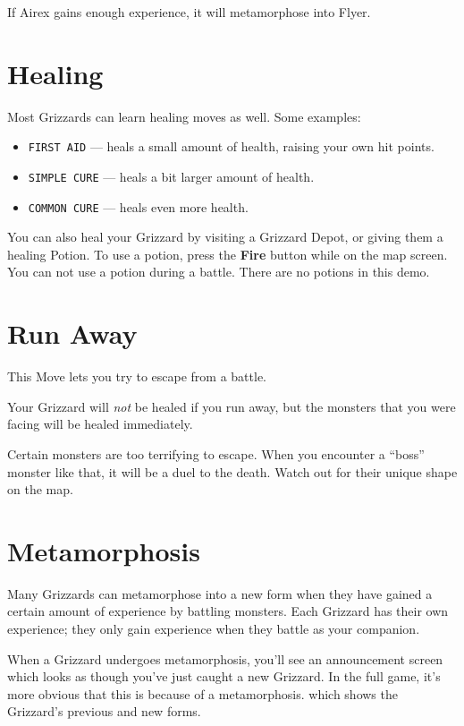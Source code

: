 \documentclass[10pt,twocolumn,openany,article]{memoir}
\begin{document}
If Airex gains enough experience, it will metamorphose into Flyer.

\fi

\section{Healing}

Most Grizzards can learn healing moves as well. Some examples:

\begin{itemize}
\item \texttt{FIRST  AID} ---  heals a small  amount of  health, raising
  your own hit points.
\item \texttt{SIMPLE CURE} --- heals a bit larger amount of health.
\item \texttt{COMMON CURE} --- heals even more health.
\end{itemize}

You can also heal your Grizzard  by visiting a Grizzard Depot, or giving
them a healing  Potion. To use a potion, press  the \textbf{Fire} button
while on  the map  screen. You  can not  use a  potion during  a battle.
\ifdefined\DEMO There are no potions in this demo. \fi

\section{Run Away}

This Move lets you try to escape from a battle.

Your  Grizzard will  \emph{not}  be  healed if  you  run  away, but  the
monsters that you were facing will be healed immediately.

Certain  monsters  are too  terrifying  to  escape. When  you  encounter
a ``boss'' monster like that, it will  be a duel to the death. Watch out
for their unique shape on the map.

\section{Metamorphosis}

Many Grizzards  can metamorphose into a  new form when they  have gained
a certain amount  of experience by battling monsters.  Each Grizzard has
their  own experience;  they only  gain experience  when they  battle as
your companion.

When  a Grizzard  undergoes  metamorphosis, you'll  see an  announcement
screen  \ifdefined\DEMO  which  looks   as  though  you've  just  caught
a new Grizzard. In the full game, it's more obvious that this is because
of  a  metamorphosis. \else  which  shows  the Grizzard's  previous  and
new forms. \fi
\end{document}
